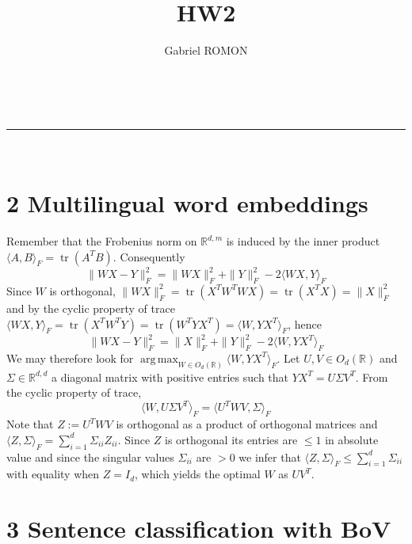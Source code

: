 \documentclass[a4paper,11pt, hidelinks]{article}
\makeatletter
\newcommand{\linia}{\rule{\linewidth}{0.5pt}}
\renewcommand{\maketitle}{
\begin{center}
\vspace{2ex}
{\huge \textsc{\@title}}
\vspace{1ex}
\\
\linia\\
\@author 
\vspace{4ex}
\end{center}
}
\DeclareMathOperator*{\argmax}{arg\,max}
\DeclareMathOperator*{\tr}{tr}
\makeatother
\begin{document}
\title{HW2}

\author{Gabriel ROMON}



\maketitle

\section*{2 Multilingual word embeddings}

Remember that the Frobenius norm on $\mathbb R^{d,m}$ is induced by the inner product $\langle A,B \rangle_F = \tr(A^TB)$. Consequently $$\|WX - Y\|_F^2 = \|WX\|_F^2 + \|Y\|_F^2 - 2\langle WX, Y\rangle_F$$
Since $W$ is orthogonal, $\|WX\|_F^2 = \tr(X^TW^TWX) = \tr(X^TX) = \|X\|_F^2$ and by the cyclic property of trace $\langle WX, Y\rangle_F = \tr(X^TW^TY) = \tr(W^TYX^T) = \langle W, YX^T\rangle_F$, hence 
$$\|WX - Y\|_F^2 = \|X\|_F^2 + \|Y\|_F^2  -2\langle W, YX^T\rangle_F $$ We may therefore look for $\argmax_{W\in O_d(\mathbb R)} \langle W, YX^T\rangle_F$.\newline
Let $U, V\in O_d(\mathbb R)$ and $\Sigma \in \mathbb R^{d,d}$ a diagonal matrix with positive entries such that $YX^T = U\Sigma V^T$. From the cyclic property of trace, $$\langle W,U\Sigma V^T\rangle_F = \langle U^TW V,\Sigma\rangle_F$$
Note that $Z:=U^TW V$ is orthogonal as a product of orthogonal matrices and $\langle Z,\Sigma\rangle_F = \sum_{i=1}^d \Sigma_{ii} Z_{ii}$. Since $Z$ is orthogonal its entries are $\leq 1$ in absolute value and since the singular values $\Sigma_{ii}$ are $>0$ we infer that $\langle Z,\Sigma\rangle_F \leq \sum_{i=1}^d \Sigma_{ii}$ with equality when $Z=I_d$, which yields the optimal $W$ as $UV^T$.


\section*{3 Sentence classification with BoV}
\end{document}
